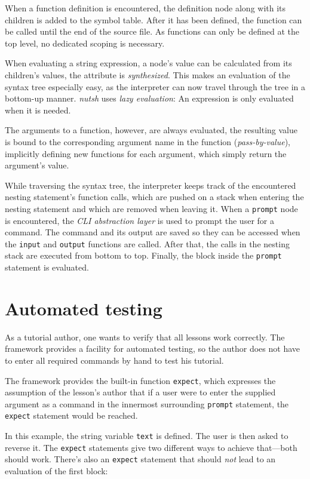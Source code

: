 \documentclass[paper=a4,abstract=on,cleardoublepage=empty,numbers=noenddot,toc=bib,12pt,appendixprefix=true]{scrreprt}
\begin{document}
When a function definition is encountered, the definition node along with its children is added to the symbol table. After it has been defined, the function can be called until the end of the source file. As functions can only be defined at the top level, no dedicated scoping is necessary.

When evaluating a string expression, a node's value can be calculated from its children's values, the attribute is \emph{synthesized}. This makes an evaluation of the syntax tree especially easy, as the interpreter can now travel through the tree in a bottom-up manner. \emph{nutsh} uses \emph{lazy evaluation}: An expression is only evaluated when it is needed.

The arguments to a function, however, are always evaluated, the resulting value is bound to the corresponding argument name in the function (\emph{pass-by-value}), implicitly defining new functions for each argument, which simply return the argument's value.

While traversing the syntax tree, the interpreter keeps track of the encountered nesting statement's function calls, which are pushed on a stack when entering the nesting statement and which are removed when leaving it. When a \texttt{prompt} node is encountered, the \emph{CLI abstraction layer} is used to prompt the user for a command. The command and its output are saved so they can be accessed when the \texttt{input} and \texttt{output} functions are called. After that, the calls in the nesting stack are executed from bottom to top. Finally, the block inside the \texttt{prompt} statement is evaluated.

\section{Automated testing}
\label{sec:testing}

As a tutorial author, one wants to verify that all lessons work correctly. The framework provides a facility for automated testing, so the author does not have to enter all required commands by hand to test his tutorial.

The framework provides the built-in function \texttt{expect}, which expresses the assumption of the lesson's author that if a user were to enter the supplied argument as a command in the innermost surrounding \texttt{prompt} statement, the \texttt{expect} statement would be reached.

In this example, the string variable \texttt{text} is defined. The user is then asked to reverse it. The \texttt{expect} statements give two different ways to achieve that---both should work. There's also an \texttt{expect} statement that should \emph{not} lead to an evaluation of the first block:
\end{document}
